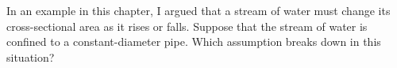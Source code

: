         In an example in this chapter, I argued that a stream of water must change
        its cross-sectional area as it rises or falls. Suppose that the stream of
        water is confined to a constant-diameter pipe. Which assumption breaks
        down in this situation?
